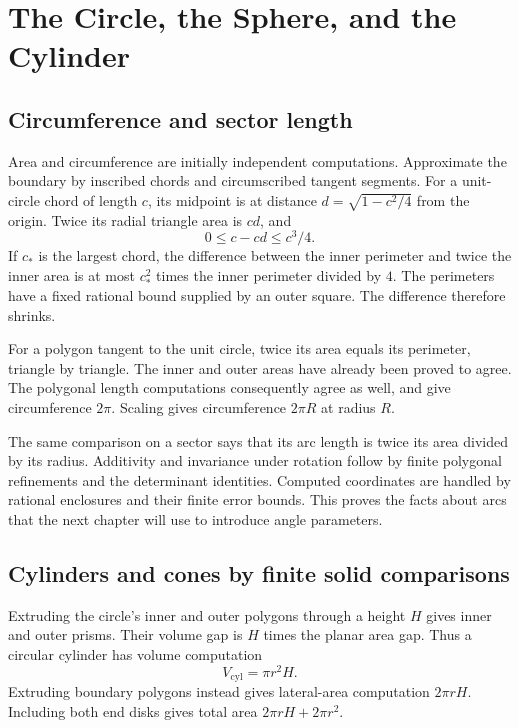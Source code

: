 \chapter{The Circle, the Sphere, and the Cylinder}\label{ch:circle-sphere}



\section{Circumference and sector length}
Area and circumference are initially independent computations.  Approximate
the boundary by inscribed chords and circumscribed tangent segments.
For a unit-circle chord of length $c$, its midpoint is at distance
$d=\sqrt{1-c^2/4}$ from the origin.  Twice its radial triangle area is
$cd$, and
\[
 0\le c-cd\le c^3/4.
\]
If $c_*$ is the largest chord, the difference between the inner perimeter
and twice the inner area is at most $c_*^2$ times the inner perimeter
divided by $4$.  The perimeters have a fixed rational bound supplied by
an outer square.  The difference therefore shrinks.

For a polygon tangent to the unit circle, twice its area equals its
perimeter, triangle by triangle.  The inner and outer areas have already
been proved to agree.  The polygonal length computations consequently agree
as well, and give circumference $2\pi$.  Scaling gives circumference
$2\pi R$ at radius $R$.

The same comparison on a sector says that its arc length is twice its
area divided by its radius.  Additivity and invariance under rotation
follow by finite polygonal refinements and the determinant identities.
Computed coordinates are handled by rational enclosures and their finite
error bounds.  This proves the facts about arcs that the next chapter
will use to introduce angle parameters.

\section{Cylinders and cones by finite solid comparisons}
\label{sec:cone-exhaustion}
Extruding the circle's inner and outer polygons through a height $H$
gives inner and outer prisms.  Their volume gap is $H$ times the planar
area gap.  Thus a circular cylinder has volume computation
\[
 V_{\mathrm{cyl}}=\pi r^2H.
\]
Extruding boundary polygons instead gives lateral-area computation
$2\pi rH$.  Including both end disks gives total area
$2\pi rH+2\pi r^2$.

